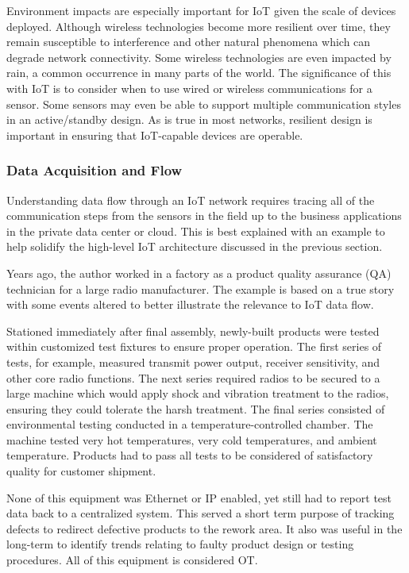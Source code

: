 Environment impacts are especially important for IoT given the scale of
devices deployed. Although wireless technologies become more resilient over
time, they remain susceptible to interference and other natural phenomena
which can degrade network connectivity. Some wireless technologies are even
impacted by rain, a common occurrence in many parts of the world. The
significance of this with IoT is to consider when to use wired or wireless
communications for a sensor. Some sensors may even be able to support multiple
communication styles in an active/standby design. As is true in most networks,
resilient design is important in ensuring that IoT-capable devices are operable.

\subsubsection{Data Acquisition and Flow}
Understanding data flow through an IoT network requires tracing all of the
communication steps from the sensors in the field up to the business
applications in the private data center or cloud. This is best explained with
an example to help solidify the high-level IoT architecture discussed in the
previous section.

Years ago, the author worked in a factory as a product quality assurance (QA)
technician for a large radio manufacturer. The example is based on a true
story with some events altered to better illustrate the relevance to IoT data
flow.

Stationed immediately after final assembly, newly-built products were tested
within customized test fixtures to ensure proper operation. The first series
of tests, for example, measured transmit power output, receiver sensitivity,
and other core radio functions. The next series required radios to be secured
to a large machine which would apply shock and vibration treatment to the
radios, ensuring they could tolerate the harsh treatment. The final series
consisted of environmental testing conducted in a temperature-controlled
chamber. The machine tested very hot temperatures, very cold temperatures, and
ambient temperature. Products had to pass all tests to be considered of
satisfactory quality for customer shipment.

None of this equipment was Ethernet or IP enabled, yet still had to report
test data back to a centralized system. This served a short term purpose of
tracking defects to redirect defective products to the rework area. It also
was useful in the long-term to identify trends relating to faulty product
design or testing procedures. All of this equipment is considered OT\@.

